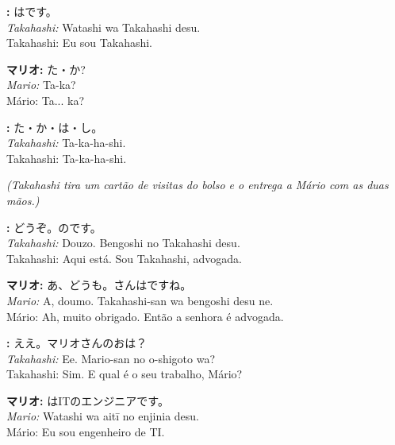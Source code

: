 \documentclass[12pt,a4paper]{article}
\begin{document}
\vspace{0.5em}

\textbf{:} はです。\\
\textit{Takahashi:} Watashi wa Takahashi desu.\\
Takahashi: Eu sou Takahashi.

\vspace{0.5em}

\textbf{マリオ:} た・か?\\
\textit{Mario:} Ta-ka?\\
Mário: Ta... ka?

\vspace{0.5em}

\textbf{:} た・か・は・し。\\
\textit{Takahashi:} Ta-ka-ha-shi.\\
Takahashi: Ta-ka-ha-shi.

\vspace{0.3em}
\textit{(Takahashi tira um cartão de visitas do bolso e o entrega a Mário com as duas mãos.)}
\vspace{0.3em}

\textbf{:} どうぞ。のです。\\
\textit{Takahashi:} Douzo. Bengoshi no Takahashi desu.\\
Takahashi: Aqui está. Sou Takahashi, advogada.

\vspace{0.5em}

\textbf{マリオ:} あ、どうも。さんはですね。\\
\textit{Mario:} A, doumo. Takahashi-san wa bengoshi desu ne.\\
Mário: Ah, muito obrigado. Então a senhora é advogada.

\vspace{0.5em}

\textbf{:} ええ。マリオさんのおは？\\
\textit{Takahashi:} Ee. Mario-san no o-shigoto wa?\\
Takahashi: Sim. E qual é o seu trabalho, Mário?

\vspace{0.5em}

\textbf{マリオ:} はITのエンジニアです。\\
\textit{Mario:} Watashi wa aitī no enjinia desu.\\
Mário: Eu sou engenheiro de TI.
\end{document}
